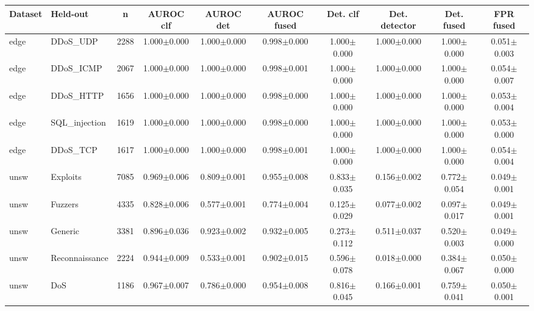 \begin{tabular}{llcccccccc}
\toprule
Dataset & Held-out & n & AUROC clf & AUROC det & AUROC fused & Det. clf & Det. detector & Det. fused & FPR fused \\
\midrule
edge & DDoS\_UDP & 2288 & 1.000$\pm$0.000 & 1.000$\pm$0.000 & 0.998$\pm$0.000 & 1.000$\pm$0.000 & 1.000$\pm$0.000 & 1.000$\pm$0.000 & 0.051$\pm$0.003 \\
edge & DDoS\_ICMP & 2067 & 1.000$\pm$0.000 & 1.000$\pm$0.000 & 0.998$\pm$0.001 & 1.000$\pm$0.000 & 1.000$\pm$0.000 & 1.000$\pm$0.000 & 0.054$\pm$0.007 \\
edge & DDoS\_HTTP & 1656 & 1.000$\pm$0.000 & 1.000$\pm$0.000 & 0.998$\pm$0.000 & 1.000$\pm$0.000 & 1.000$\pm$0.000 & 1.000$\pm$0.000 & 0.053$\pm$0.004 \\
edge & SQL\_injection & 1619 & 1.000$\pm$0.000 & 1.000$\pm$0.000 & 0.998$\pm$0.000 & 1.000$\pm$0.000 & 1.000$\pm$0.000 & 1.000$\pm$0.000 & 0.053$\pm$0.000 \\
edge & DDoS\_TCP & 1617 & 1.000$\pm$0.000 & 1.000$\pm$0.000 & 0.998$\pm$0.001 & 1.000$\pm$0.000 & 1.000$\pm$0.000 & 1.000$\pm$0.000 & 0.054$\pm$0.004 \\
unsw & Exploits & 7085 & 0.969$\pm$0.006 & 0.809$\pm$0.001 & 0.955$\pm$0.008 & 0.833$\pm$0.035 & 0.156$\pm$0.002 & 0.772$\pm$0.054 & 0.049$\pm$0.001 \\
unsw & Fuzzers & 4335 & 0.828$\pm$0.006 & 0.577$\pm$0.001 & 0.774$\pm$0.004 & 0.125$\pm$0.029 & 0.077$\pm$0.002 & 0.097$\pm$0.017 & 0.049$\pm$0.001 \\
unsw & Generic & 3381 & 0.896$\pm$0.036 & 0.923$\pm$0.002 & 0.932$\pm$0.005 & 0.273$\pm$0.112 & 0.511$\pm$0.037 & 0.520$\pm$0.003 & 0.049$\pm$0.000 \\
unsw & Reconnaissance & 2224 & 0.944$\pm$0.009 & 0.533$\pm$0.001 & 0.902$\pm$0.015 & 0.596$\pm$0.078 & 0.018$\pm$0.000 & 0.384$\pm$0.067 & 0.050$\pm$0.000 \\
unsw & DoS & 1186 & 0.967$\pm$0.007 & 0.786$\pm$0.000 & 0.954$\pm$0.008 & 0.816$\pm$0.045 & 0.166$\pm$0.001 & 0.759$\pm$0.041 & 0.050$\pm$0.001 \\
\bottomrule
\end{tabular}
